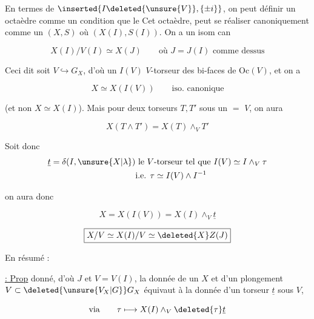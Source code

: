 En termes de $\inserted{I\deleted{\unsure{V}},\{\pm i\}}$, on peut définir un octaèdre  comme un  condition que le     Cet  octaèdre,  peut se réaliser canoniquement  comme un $(X,S)$ où $(X(I),S(I))$. On a un isom can


\[
X(I)/V(I)\simeq X(J)\qquad\text{où }J=J(I)\text{ comme dessus}
\]

Ceci dit soit  $V\hookrightarrow G_X$, d'où un $I(V)$ $V$-torseur des bi-faces de $\mathrm{Oc}(V)$, et on a 

\[
X\simeq X(I(V))\qquad\text{iso. canonique}
\]

(et non $X\simeq X(I)$). Mais pour  deux torseurs $T,T'$ sous un $=$ $V$, on aura

\[
X(T\wedge T')=X(T)\wedge_V T'
\]


Soit donc
\[
\begin{aligned}
\underline{t}=\delta(I,\unsure{X|\lambda})&\text{ le }V\text{-torseur tel que }I(V)\simeq I\wedge_V\tau\\
&\text{i.e. }\tau\simeq I(V)\wedge I^{-1}
\end{aligned}
\]

on aura donc

\[
\boxed{X=X(I(V))=X(I)\wedge_V\underline t}
\]

  

\[
\boxed{X/V\simeq X(I)/V\simeq \deleted{X}Z(J)}
\]

En résumé :

\uline{ : Prop}   donné, d'où $J$ et $V=V(I)$, la donnée de un $X$ et d'un plongement $V\subset \deleted{\unsure{V_X|G}}G_X$ équivaut à la donnée d'un torseur $\underline t$ sous $V$,

\[
\text{via}\qquad \tau\longmapsto X(I)\wedge_V\deleted{\tau}\underline t
\]

